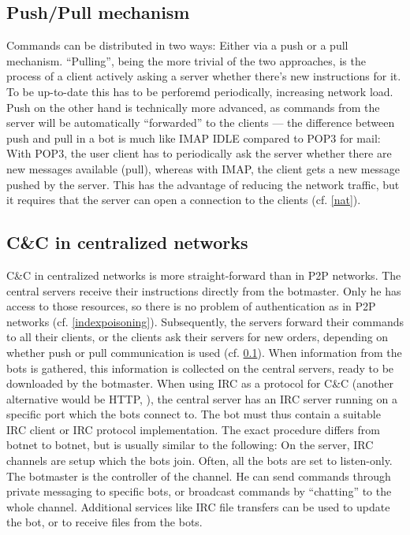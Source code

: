 \documentclass{llncs}
\begin{document}
\subsection{Push/Pull mechanism}
\label{pushpull}
Commands can be distributed in two ways: Either via a push or a pull
mechanism. ``Pulling'', being the more trivial of the two approaches,
is the process of a client actively asking a server whether there's
new instructions for it. To be up-to-date this has to be perforemd
periodically, increasing network load.  Push on the other hand is
technically more advanced, as commands from the server will be
automatically ``forwarded'' to the clients --- the difference between
push and pull in a bot is much like IMAP IDLE compared to POP3 for
mail: With POP3, the user client has to periodically ask the server
whether there are new messages available (pull), whereas with IMAP,
the client gets a new message pushed by the server. This has the
advantage of reducing the network traffic, but it requires that the
server can open a connection to the clients (cf. \ref{nat}).


\subsection{C\&C in centralized networks}
C\&C in centralized networks is more straight-forward than in P2P
networks. The central servers receive their instructions directly from
the botmaster. Only he has access to those resources, so there is no
problem of authentication as in P2P networks
(cf. \ref{indexpoisoning}). Subsequently, the servers forward their
commands to all their clients, or the clients ask their servers for
new orders, depending on whether push or pull communication is used
(cf. \ref{pushpull}). When information from the bots is gathered, this
information is collected on the central servers, ready to be
downloaded by the botmaster. When using IRC as a protocol for C\&C
(another alternative would be HTTP, \cite{li2009botnet}), the central
server has an IRC server running on a specific port which the bots
connect to. The bot must thus contain a suitable IRC client or IRC
protocol implementation. The exact procedure differs from botnet to
botnet, but is usually similar to the following: On the server, IRC
channels are setup which the bots join. Often, all the bots are set to
listen-only. The botmaster is the controller of the channel. He can
send commands through private messaging to specific bots, or broadcast
commands by ``chatting'' to the whole channel. Additional services
like IRC file transfers can be used to update the bot, or to receive
files from the bots.
\end{document}
